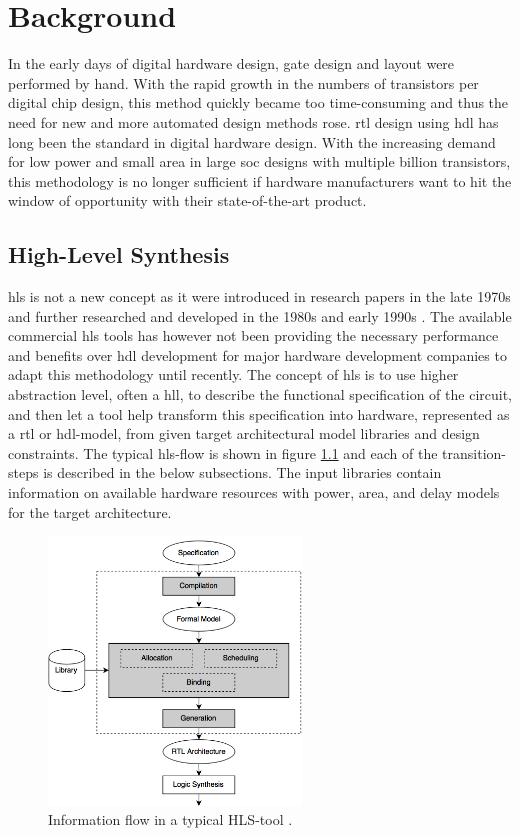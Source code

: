\chapter{\label{chp:background}Background}
In the early days of digital hardware design, gate design and layout were performed by hand. With the rapid growth in the numbers of transistors per digital chip design, this method quickly became too time-consuming and thus the need for new and more automated design methods rose. \gls{rtl} design using \gls{hdl} has long been the standard in digital hardware design. With the increasing demand for low power and small area in large \gls{soc} designs with multiple billion transistors, this methodology is no longer sufficient if hardware manufacturers want to hit the window of opportunity with their state-of-the-art product.

\section{\label{sec:hls}High-Level Synthesis}

\gls{hls} is not a new concept as it were introduced in research papers in the late 1970s and further researched and developed in the 1980s and early 1990s \cite{martin2009high}. The available commercial \gls{hls} tools has however not been providing the necessary performance and benefits over \gls{hdl} development for major hardware development companies to adapt this methodology until recently.
The concept of \gls{hls} is to use higher abstraction level, often a \gls{hll}, to describe the functional specification of the circuit, and then let a tool help transform this specification into hardware, represented as a \gls{rtl} or \gls{hdl}-model, from given target architectural model libraries and design constraints. The typical \gls{hls}-flow is shown in figure \ref{fig:hlsflow} and each of the transition-steps is described in the below subsections. The input libraries contain information on available hardware resources with power, area, and delay models for the target architecture.

\begin{figure}[hbpt]
\centering
\includegraphics[width=0.6\textwidth]{../figs/HLSFlow.png}
\caption{\label{fig:hlsflow}Information flow in a typical HLS-tool \cite{coussy2009introduction}.}
\end{figure}

